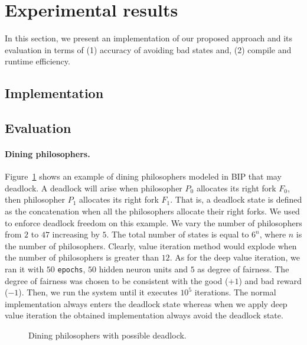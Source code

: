 \section{Experimental results}
In this section, we present \rerl an implementation of our proposed approach and its evaluation in terms of (1) accuracy of avoiding bad states and, (2) compile and runtime efficiency. 
\subsection{Implementation}

\subsection{Evaluation}
\paragraph{Dining philosophers.} Figure~\ref{fig:diningbench} shows an example of dining philosophers modeled in BIP that may deadlock. A deadlock will arise when philosopher $P_0$ allocates its right fork $F_0$, then philosopher $P_1$ allocates its right fork $F_1$. That is, a deadlock state is defined as the concatenation when all the philosophers allocate their right forks. We used \rerl to enforce deadlock freedom on this example. We vary the number of philosophers from $2$ to $47$ increasing by $5$. The total number of states is equal to $6^{n}$, where $n$ is the number of philosophers. 
Clearly, value iteration method would explode when the number of philosophers is greater than $12$. 
%
As for the deep value iteration, we ran it with $50$ \texttt{epochs}, $50$ hidden neuron units and $5$ as degree of fairness. The degree of fairness was chosen to be consistent with the good ($+1$) and bad reward ($-1$). Then, we run the system until it executes $10^5$ iterations. The normal implementation always enters the deadlock state whereas when we apply deep value iteration the obtained implementation always avoid the deadlock state.  
%
\begin{figure}[t]
\centering
{}
\caption{Dining philosophers with possible deadlock.}
\label{fig:diningbench}
\end{figure}
%
